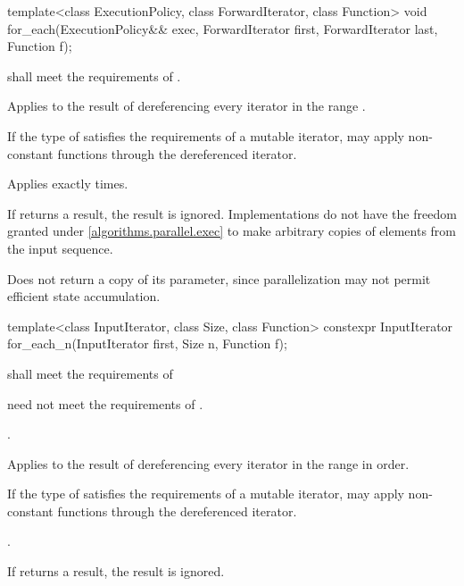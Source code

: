 %
\begin{itemdecl}
template<class ExecutionPolicy, class ForwardIterator, class Function>
  void for_each(ExecutionPolicy&& exec,
                ForwardIterator first, ForwardIterator last,
                Function f);
\end{itemdecl}

\begin{itemdescr}
\pnum
\requires
{} shall meet the requirements of .

\pnum
\effects
Applies  to the result of dereferencing every iterator in the range
.
\begin{note}
If the type of  satisfies the requirements of a mutable iterator,
 may apply non-constant functions through the dereferenced iterator.
\end{note}

\pnum
\complexity
Applies  exactly  times.

\pnum
\remarks
If  returns a result, the result is ignored.
Implementations do not
have the freedom granted under \ref{algorithms.parallel.exec} to make arbitrary
copies of elements from the input sequence.

\pnum
\begin{note}
Does not return a copy of its  parameter, since
parallelization may not permit efficient state accumulation.
\end{note}
\end{itemdescr}

%
\begin{itemdecl}
template<class InputIterator, class Size, class Function>
  constexpr InputIterator for_each_n(InputIterator first, Size n, Function f);
\end{itemdecl}

\begin{itemdescr}
\pnum
\requires
{} shall meet the requirements of 
\begin{note}  need not meet the requirements of
. \end{note}

\pnum
\requires
{}.

\pnum
\effects
Applies  to the result of dereferencing every iterator in the range
 in order.
\begin{note}
If the type of  satisfies the requirements of a mutable iterator,
 may apply non-constant functions through the dereferenced iterator.
\end{note}

\pnum
\returns
{}.

\pnum
\remarks
If  returns a result, the result is ignored.
\end{itemdescr}


